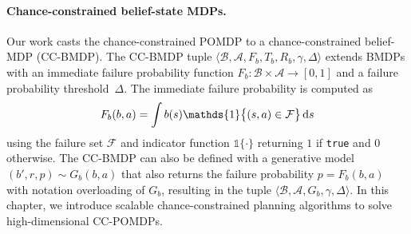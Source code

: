 \paragraph{Chance-constrained belief-state MDPs.}
Our work casts the chance-constrained POMDP to a chance-constrained belief-MDP (CC-BMDP).
The CC-BMDP tuple $\langle \mathcal{B}, \mathcal{A}, F_b, T_b, R_b, \gamma, \Delta \rangle$ extends BMDPs with an immediate failure probability function $F_b: \mathcal{B} \times \mathcal{A} \to [0, 1]$ and a failure probability threshold~$\Delta$.
The immediate failure probability is computed as
\begin{equation}
    F_b(b, a) = \int b(s) \mathds{1}\big\{(s,a) \in \mathcal{F}\big\} \diff s
\end{equation}
using the failure set $\mathcal{F}$ and indicator function $\mathds{1}\{\cdot\}$ returning $1$ if \texttt{true} and $0$ otherwise.
The CC-BMDP can also be defined with a generative model $(b', r, p) \sim G_b(b,a)$ that also returns the failure probability $p = F_b(b,a)$ with notation overloading of $G_b$, resulting in the tuple $\langle \mathcal{B}, \mathcal{A}, G_b, \gamma, \Delta \rangle$.
In this chapter, we introduce scalable chance-constrained planning algorithms to solve high-dimensional CC-POMDPs.



